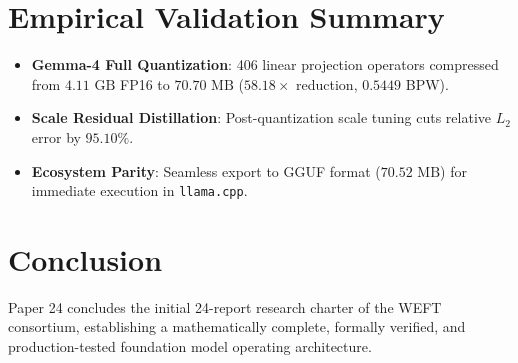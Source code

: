 \documentclass[11pt,a4paper]{article}
\begin{document}
\section{Empirical Validation Summary}
\begin{itemize}
    \item \textbf{Gemma-4 Full Quantization}: 406 linear projection operators compressed from $4.11\text{ GB}$ FP16 to $70.70\text{ MB}$ ($58.18\times$ reduction, $0.5449$ BPW).
    \item \textbf{Scale Residual Distillation}: Post-quantization scale tuning cuts relative $L_2$ error by $95.10\%$.
    \item \textbf{Ecosystem Parity}: Seamless export to GGUF format ($70.52\text{ MB}$) for immediate execution in \texttt{llama.cpp}.
\end{itemize}

\section{Conclusion}
Paper 24 concludes the initial 24-report research charter of the WEFT consortium, establishing a mathematically complete, formally verified, and production-tested foundation model operating architecture.
\end{document}
